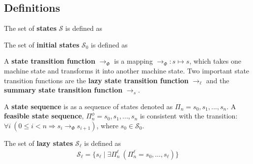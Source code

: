 \subsection{Definitions}

\begin{definition}
The set of \textbf{states} $\mathcal{S}$ is defined as
\end{definition}

\begin{definition}
The set of \textbf{initial states} $\mathcal{S}_0$ is defined as
\end{definition}

\begin{definition}
A \textbf{state transition function} $\rightarrow_{\Phi}$ is a mapping $\rightarrow_{\Phi} : s \mapsto s$, which takes one machine state and transforms it into another machine state. Two important state transition functions are the \textbf{lazy state transition function} $\rightarrow_\ell$ and the \textbf{summary state transition function} $\rightarrow_s$.
\end{definition}

\begin{definition}
A \textbf{state sequence} is as a sequence of states denoted as $\Pi_n = s_0,s_1,...,s_n$. A \textbf{feasible state sequence}, $\Pi_n^\phi = s_0,s_1,...,s_n$ is consistent with the transition: $\forall i\ (0 \leq i < n \Rightarrow s_i \rightarrow_{\Phi} s_{i+1})$, where $s_0\in \mathcal{S}_0$.
\end{definition}

\begin{comment}
\begin{definition}
A \textbf{feasible state sequence} is defined as a sequence of states resulting from repeated application of the state transition relation to some initial state $s_0\in \mathcal{S}_0$: $$\Pi_n = s_0,s_1,...,s_n$$ where the relation $s_i \rightarrow_{\Phi} s_{i+1}$ holds for all $i \in \{ i | 0 \leq i < n \}$
\end{definition}
\end{comment}

\begin{definition}
The set of \textbf{lazy states} $\mathcal{S}_\ell$ is defined as
\begin{align}
\mathcal{S}_\ell = \{s_\ell \mid \exists \Pi_n^\ell\ (\Pi_n^\ell = s_0, \ldots, s_\ell)\}
\end{align}
\end{definition}

